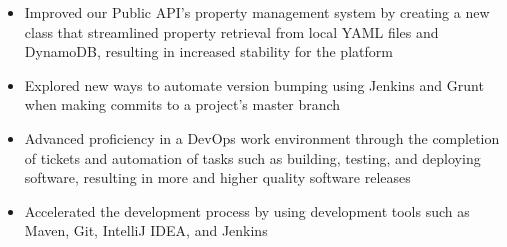 \documentclass[]{cv-style}
\begin{document}
\begin{entrylist}
{\begin{itemize}
    \item Improved our Public API's property management system by creating a new class that streamlined property retrieval from local YAML files and DynamoDB, resulting in increased stability for the platform
    \item Explored new ways to automate version bumping using Jenkins and Grunt when making commits to a project's master branch
    \item Advanced proficiency in a DevOps work environment through the completion of tickets and automation of tasks such as building, testing, and deploying software, resulting in more and higher quality software releases
    
    \item Accelerated the development process by using development tools such as Maven, Git, IntelliJ IDEA, and Jenkins
\end{itemize}}
\end{entrylist}


\end{document}
